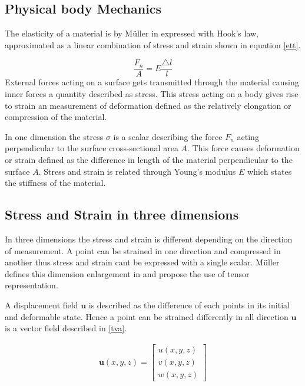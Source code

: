 \documentclass[10pt,a4paper]{article}
\begin{document}
\subsection{Physical body Mechanics}
The elasticity of a material is by M\"uller in \cite{rt_phys} expressed with Hook's law, approximated as a linear combination of stress and strain shown in equation \ref{ett}.

\begin{equation}\label{ett}
    \frac{F_{n}}{A} = E \frac{\triangle l}{l}
\end{equation}
External forces acting on a surface gets transmitted through the material causing inner forces a quantity described as stress. This stress acting on a body gives rise to strain an measurement of deformation defined as the relatively elongation or compression of the material.

In one dimension the stress $\sigma$ is a scalar describing the force $ F_{n}$ acting perpendicular to the surface cross-sectional area $A$.
This force causes deformation or strain defined as the difference in length of the material perpendicular to the surface $A$. Stress and strain is related through Young's modulus $E$ which states the stiffness of the material.

\subsection{Stress and Strain in three dimensions}\label{stressnstrain}
In three dimensions the stress and strain is different depending on the direction of measurement. A point can be strained in one direction and compressed in another thus stress and strain cant be expressed with a single scalar. M\"uller defines this dimension enlargement in \cite{rt_phys} and propose the use of tensor representation.

A displacement field $\mathbf{u}$ is described as the difference of each points in its initial and deformable state. Hence a point can be strained differently in all direction $\mathbf{u}$ is a vector field described in \ref{tva}.


\begin{eqnarray}\label{tva}
    \mathbf{u}(x, y, z) = \left[ \begin{array}{c}
u(x, y, z) \\
v(x, y, z) \\
w(x, y, z) \end{array} \right]
\end{eqnarray}
\end{document}
